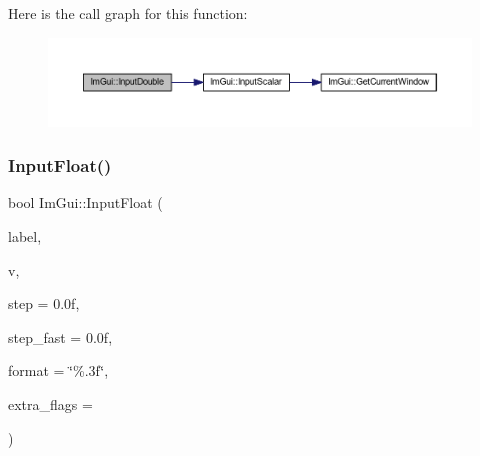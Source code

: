 Here is the call graph for this function\+:
\nopagebreak
\begin{figure}[H]
\begin{center}
\leavevmode
\includegraphics[width=350pt]{namespace_im_gui_a1c3c95609588b324e21ce0c7a549025f_cgraph}
\end{center}
\end{figure}
\mbox{\label{namespace_im_gui_af10a28bbd9577edd54849516819872f5}} 
\subsubsection{\texorpdfstring{Input\+Float()}{InputFloat()}\hspace{0.1cm}{\footnotesize\ttfamily [1/2]}}
{\footnotesize\ttfamily bool Im\+Gui\+::\+Input\+Float (\begin{DoxyParamCaption}\item[{const char $\ast$}]{label,  }\item[{float $\ast$}]{v,  }\item[{float}]{step = {\ttfamily 0.0f},  }\item[{float}]{step\+\_\+fast = {\ttfamily 0.0f},  }\item[{const char $\ast$}]{format = {\ttfamily \char`\"{}\%.3f\char`\"{}},  }\item[{\mbox{\hyperlink{imgui_8h_a7d2c6153a6b9b5d3178ce82434ac9fb8}{Im\+Gui\+Input\+Text\+Flags}}}]{extra\+\_\+flags = {} }\end{DoxyParamCaption})}

